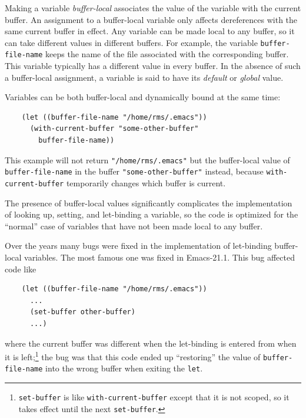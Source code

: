 \documentclass[format=acmsmall, review]{acmart}
\begin{document}
Making a variable \emph{buffer-local} associates the value of the variable
with the current buffer.  An assignment to a buffer-local variable
only affects dereferences with the same current buffer in effect.
Any variable can be made local to any buffer, so it can take
different values in different buffers.  For example, the variable
\texttt{buffer-file-name} keeps the name of the file associated with the
corresponding buffer.  This variable typically has a different value in
every buffer.  In the absence of such a buffer-local assignment, a variable
is said to have its \emph{default} or \emph{global} value.

Variables can be both buffer-local and dynamically bound at the same time:
\begin{verbatim}
    (let ((buffer-file-name "/home/rms/.emacs"))
      (with-current-buffer "some-other-buffer"
        buffer-file-name))
\end{verbatim}
This example will not return \texttt{"/home/rms/.emacs"} but the
buffer-local value of \texttt{buffer-file-name} in the buffer
\texttt{"some-other-buffer"} instead, because \texttt{with-current-buffer}
temporarily changes which buffer is current.

The presence of buffer-local values significantly complicates the
implementation of looking up, setting, and let-binding a variable, so the
code is optimized for the ``normal'' case of variables that have not been
made local to any buffer.

Over the years many bugs were fixed in the implementation of let-binding
buffer-local variables.  The most famous one was fixed in Emacs-21.1.
This bug affected code like
\begin{verbatim}
    (let ((buffer-file-name "/home/rms/.emacs"))
      ...
      (set-buffer other-buffer)
      ...)
\end{verbatim}
where the current buffer was different when the let-binding is entered from
when it is left;\footnote{\texttt{set-buffer} is like
  \texttt{with-current-buffer} except that it is not scoped, so it takes
  effect until the next \texttt{set-buffer}.} the bug was that this code
ended up ``restoring'' the value of \texttt{buffer-file-name} into the
wrong buffer when exiting the \texttt{let}.
\end{document}

